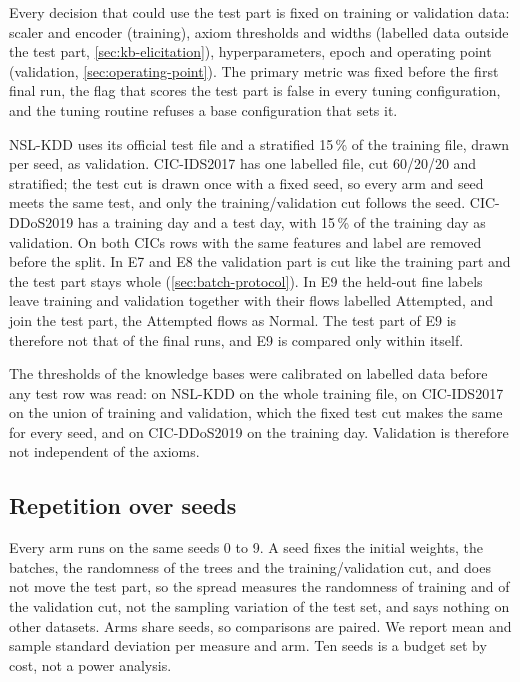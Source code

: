 Every decision that could use the test part is fixed on training or validation data: scaler
and encoder (training), axiom thresholds and widths (labelled data outside the test part,
\cref{sec:kb-elicitation}), hyperparameters, epoch and operating point (validation,
\cref{sec:operating-point}). The primary metric was fixed before the first final run, the flag
that scores the test part is false in every tuning configuration, and the tuning routine refuses
a base configuration that sets it.

NSL-KDD uses its official test file and a stratified 15\,\% of the training file, drawn per
seed, as validation. CIC-IDS2017 has one labelled file, cut 60/20/20 and stratified; the test
cut is drawn once with a fixed seed, so every arm and seed meets the same test, and only the
training/validation cut follows the seed. CIC-DDoS2019 has a training day and a test day, with
15\,\% of the training day as validation. On both CICs rows with the same features and label
are removed before the split. In E7 and E8 the validation part is cut like the training part and
the test part stays whole (\cref{sec:batch-protocol}). In E9 the held-out fine labels leave
training and validation together with their flows labelled Attempted, and join the test part,
the Attempted flows as Normal. The test part of E9 is therefore not that of the final runs, and
E9 is compared only within itself.

The thresholds of the knowledge bases were calibrated on labelled data before any test row was
read: on NSL-KDD on the whole training file, on CIC-IDS2017 on the union of training and
validation, which the fixed test cut makes the same for every seed, and on CIC-DDoS2019 on the
training day. Validation is therefore not independent of the axioms.

\subsection{Repetition over seeds}
\label{sec:repetition}

Every arm runs on the same seeds 0 to 9. A seed fixes the initial weights, the batches, the
randomness of the trees and the training/validation cut, and does not move the test part, so
the spread measures the randomness of training and of the validation cut, not the sampling
variation of the test set, and says nothing on other datasets. Arms share seeds, so comparisons
are paired. We report mean and sample standard deviation per measure and arm. Ten seeds is a
budget set by cost, not a power analysis.

